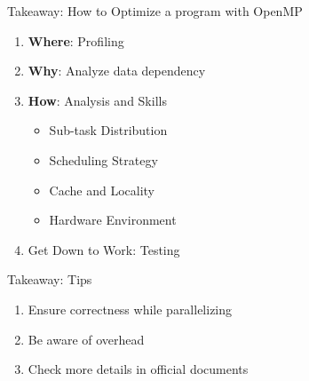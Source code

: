 \begin{frame}{Takeaway: How to Optimize a program with OpenMP}
    \begin{enumerate}
        \item \textbf{Where}: Profiling
        \item \textbf{Why}: Analyze data dependency
        \item \textbf{How}: Analysis and Skills
              \begin{itemize}
                  \item Sub-task Distribution
                  \item Scheduling Strategy
                  \item Cache and Locality
                  \item Hardware Environment
              \end{itemize}
        \item Get Down to Work: Testing
    \end{enumerate}
\end{frame}

\begin{frame}{Takeaway: Tips}
    \begin{enumerate}
        \item Ensure correctness while parallelizing
        \item Be aware of overhead
        \item Check more details in official documents
    \end{enumerate}
\end{frame}